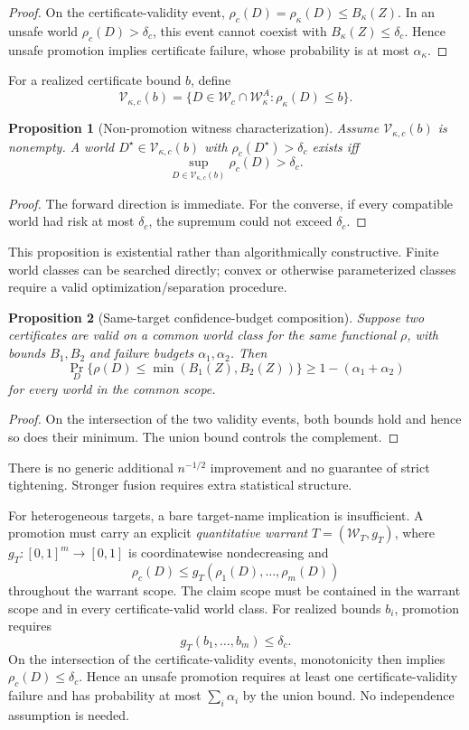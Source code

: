 \documentclass[11pt]{article}
\newtheorem{proposition}{Proposition}
\begin{document}
\begin{proof}
On the certificate-validity event,
$\rho_c(D)=\rho_\kappa(D)\le B_\kappa(Z)$. In an unsafe world
$\rho_c(D)>\delta_c$, this event cannot coexist with
$B_\kappa(Z)\le\delta_c$. Hence unsafe promotion implies certificate
failure, whose probability is at most $\alpha_\kappa$.
\end{proof}

For a realized certificate bound $b$, define
\[
\mathcal V_{\kappa,c}(b)
=
\{D\in\mathcal W_c\cap\mathcal W_\kappa^A:
\rho_\kappa(D)\le b\}.
\]

\begin{proposition}[Non-promotion witness characterization]
Assume $\mathcal V_{\kappa,c}(b)$ is nonempty. A world
$D^\star\in\mathcal V_{\kappa,c}(b)$ with
$\rho_c(D^\star)>\delta_c$ exists iff
\[
\sup_{D\in\mathcal V_{\kappa,c}(b)}\rho_c(D)>\delta_c.
\]
\end{proposition}

\begin{proof}
The forward direction is immediate. For the converse, if every compatible
world had risk at most $\delta_c$, the supremum could not exceed
$\delta_c$.
\end{proof}

This proposition is existential rather than algorithmically constructive.
Finite world classes can be searched directly; convex or otherwise
parameterized classes require a valid optimization/separation procedure.

\begin{proposition}[Same-target confidence-budget composition]
Suppose two certificates are valid on a common world class for the same
functional $\rho$, with bounds $B_1,B_2$ and failure budgets
$\alpha_1,\alpha_2$. Then
\[
\Pr_D\{\rho(D)\le\min(B_1(Z),B_2(Z))\}
\ge1-(\alpha_1+\alpha_2)
\]
for every world in the common scope.
\end{proposition}

\begin{proof}
On the intersection of the two validity events, both bounds hold and hence so
does their minimum. The union bound controls the complement.
\end{proof}

There is no generic additional $n^{-1/2}$ improvement and no guarantee of
strict tightening. Stronger fusion requires extra statistical structure.

For heterogeneous targets, a bare target-name implication is insufficient.
A promotion must carry an explicit \emph{quantitative warrant}
$T=(\mathcal W_T,g_T)$, where $g_T:[0,1]^m\to[0,1]$ is coordinatewise
nondecreasing and
\[
\rho_c(D)
\le
g_T\!\left(\rho_1(D),\ldots,\rho_m(D)\right)
\]
throughout the warrant scope.  The claim scope must be contained in the
warrant scope and in every certificate-valid world class.  For realized
bounds $b_i$, promotion requires
\[
g_T(b_1,\ldots,b_m)\le\delta_c.
\]
On the intersection of the certificate-validity events, monotonicity then
implies $\rho_c(D)\le\delta_c$.  Hence an unsafe promotion requires at
least one certificate-validity failure and has probability at most
$\sum_i\alpha_i$ by the union bound.  No independence assumption is needed.
\end{document}
